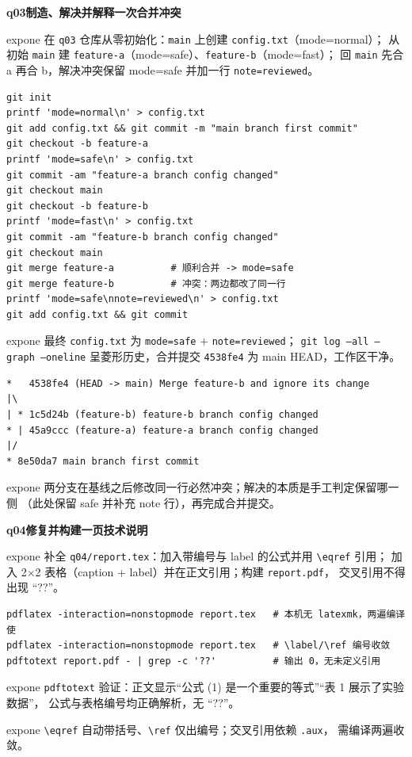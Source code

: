 \documentclass[11pt,a4paper,fontset=none]{ctexart}
\newcommand{\hwbanner}[3]{%
  \par\vspace{1.1em}
  \begin{tcolorbox}[enhanced, colback=#1!8, colframe=#1!75!black,
    boxrule=0.8pt, arc=2pt, left=7pt, right=7pt, top=4pt, bottom=4pt,
    before skip=1.1em]
    {\bfseries\color{#1!75!black}#2\qquad #3}
  \end{tcolorbox}
  \par\vspace{0.1em}\noindent\ignorespaces
}
\newcommand{\sublabel}[2]{%
  \par\vspace{0.8em}\noindent{\bfseries\color{#1!75!black}#2}\par\nobreak\vspace{0.25em}\noindent\ignorespaces
}
\begin{document}
\hwbanner{expone}{q03}{制造、解决并解释一次合并冲突}
\begin{reqbox}{expone}
  在 \texttt{q03} 仓库从零初始化：\texttt{main} 上创建 \texttt{config.txt}（mode=normal）；
  从初始 \texttt{main} 建 \texttt{feature-a}（mode=safe）、\texttt{feature-b}（mode=fast）；
  回 \texttt{main} 先合 a 再合 b，解决冲突保留 mode=safe 并加一行 \texttt{note=reviewed}。
\end{reqbox}
\sublabel{expone}{\faGit\ 操作过程}
\begin{lstlisting}[style=shell]
git init
printf 'mode=normal\n' > config.txt
git add config.txt && git commit -m "main branch first commit"
git checkout -b feature-a
printf 'mode=safe\n' > config.txt
git commit -am "feature-a branch config changed"
git checkout main
git checkout -b feature-b
printf 'mode=fast\n' > config.txt
git commit -am "feature-b branch config changed"
git checkout main
git merge feature-a          # 顺利合并 -> mode=safe
git merge feature-b          # 冲突：两边都改了同一行
printf 'mode=safe\nnote=reviewed\n' > config.txt
git add config.txt && git commit
\end{lstlisting}
\begin{resbox}{expone}
最终 \texttt{config.txt} 为 \texttt{mode=safe} + \texttt{note=reviewed}；
\texttt{git log --all --graph --oneline} 呈菱形历史，合并提交 \texttt{4538fe4} 为 main HEAD，工作区干净。
\begin{lstlisting}[style=output]
*   4538fe4 (HEAD -> main) Merge feature-b and ignore its change
|\
| * 1c5d24b (feature-b) feature-b branch config changed
* | 45a9ccc (feature-a) feature-a branch config changed
|/
* 8e50da7 main branch first commit
\end{lstlisting}
\end{resbox}
\begin{trapbox}{expone}
  两分支在基线之后修改同一行必然冲突；解决的本质是手工判定保留哪一侧
  （此处保留 safe 并补充 note 行），再完成合并提交。
\end{trapbox}

\hwbanner{expone}{q04}{修复并构建一页技术说明}
\begin{reqbox}{expone}
  补全 \texttt{q04/report.tex}：加入带编号与 label 的公式并用 \verb|\eqref| 引用；
  加入 2$\times$2 表格（caption + label）并在正文引用；构建 \texttt{report.pdf}，
  交叉引用不得出现 “??”。
\end{reqbox}
\sublabel{expone}{\faBolt\ 构建与验证}
\begin{lstlisting}[style=shell]
pdflatex -interaction=nonstopmode report.tex   # 本机无 latexmk，两遍编译使
pdflatex -interaction=nonstopmode report.tex   # \label/\ref 编号收敛
pdftotext report.pdf - | grep -c '??'          # 输出 0，无未定义引用
\end{lstlisting}
\begin{resbox}{expone}
\texttt{pdftotext} 验证：正文显示“公式 (1) 是一个重要的等式”“表 1 展示了实验数据”，
公式与表格编号均正确解析，无 “??”。
\end{resbox}
\begin{trapbox}{expone}
  \verb|\eqref| 自动带括号、\verb|\ref| 仅出编号；交叉引用依赖 \texttt{.aux}，
  需编译两遍收敛。
\end{trapbox}
\end{document}
